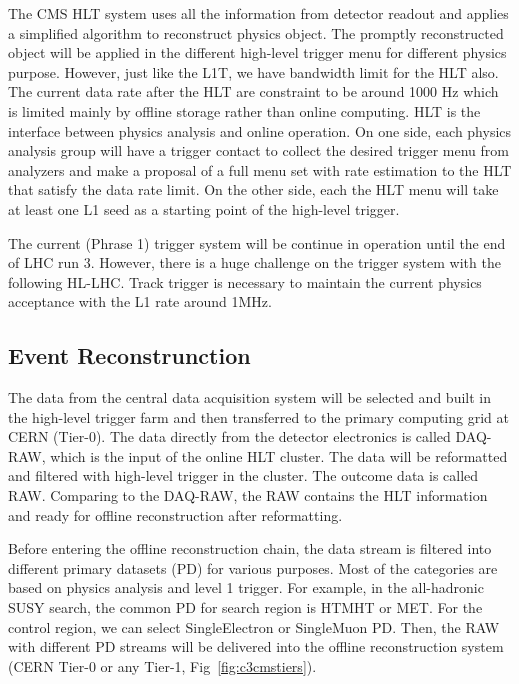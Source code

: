 The CMS HLT system uses all the information from detector readout and applies a simplified algorithm to reconstruct physics object. The promptly reconstructed object will be applied in the different high-level trigger menu for different physics purpose. However, just like the L1T, we have bandwidth limit for the HLT also. The current data rate after the HLT are constraint to be around 1000 Hz which is limited mainly by offline storage rather than online computing. HLT is the interface between physics analysis and online operation. On one side, each physics analysis group will have a trigger contact to collect the desired trigger menu from analyzers and make a proposal of a full menu set with rate estimation to the HLT that satisfy the data rate limit. On the other side, each the HLT menu will take at least one L1 seed as a starting point of the high-level trigger.

The current (Phrase 1) trigger system will be continue in operation until the end of LHC run 3. However, there is a huge challenge on the trigger system with the following HL-LHC. Track trigger is necessary to maintain the current physics acceptance with the L1 rate around 1MHz. 

\subsection{Event Reconstrunction}

The data from the central data acquisition system will be selected and built in the high-level trigger farm and then transferred to the primary computing grid at CERN (Tier-0). The data directly from the detector electronics is called DAQ-RAW, which is the input of the online HLT cluster. The data will be reformatted and filtered with high-level trigger in the cluster. The outcome data is called RAW. Comparing to the DAQ-RAW, the RAW contains the HLT information and ready for offline reconstruction after reformatting. 

Before entering the offline reconstruction chain, the data stream is filtered into different primary datasets (PD) for various purposes. Most of the categories are based on physics analysis and level 1 trigger. For example, in the all-hadronic SUSY search, the common PD for search region is HTMHT or MET. For the control region, we can select SingleElectron or SingleMuon PD. Then, the RAW with different PD streams will be delivered into the offline reconstruction system (CERN Tier-0 or any Tier-1, Fig~\ref{fig:c3cmstiers}). 

